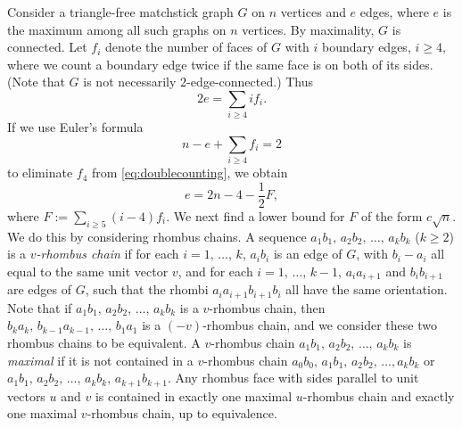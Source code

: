 \documentclass[12pt]{article}
\theoremstyle{plain}
\theoremstyle{definition}
\theoremstyle{remark}
\begin{document}
Consider a triangle-free matchstick graph $G$ on $n$ vertices and $e$ edges, where $e$ is the maximum among all such graphs on $n$ vertices.
By maximality, $G$ is connected.
Let $f_i$ denote the number of faces of $G$ with $i$ boundary edges, $i\geq 4$, where we count a boundary edge twice if the same face is on both of its sides.
(Note that $G$ is not necessarily $2$-edge-connected.)
Thus
\begin{equation}\label{eq:doublecounting}
2e=\sum_{i\geq 4} if_i.
\end{equation}
If we use Euler's formula
\begin{equation}\label{eq:Euler}
n-e+\sum_{i\geq 4}f_i = 2
\end{equation}
to eliminate $f_4$ from \eqref{eq:doublecounting}, we obtain
\begin{equation}\label{eq:consequence}
e = 2n-4-\frac12F,
\end{equation}
where $F:=\sum\limits_{i\geq 5}(i-4)f_i$.
We next find a lower bound for $F$ of the form $c\sqrt{n}$.
We do this by considering rhombus chains.
A sequence $a_1b_1, \, a_2b_2, \, \dots, \, a_kb_k$ ($k\geq 2$) is a \emph{$v$-rhombus chain} if for each $i=1, \, \dots, \, k$, $a_ib_i$ is an edge of $G$, with $b_i-a_i$ all equal to the same unit vector $v$, and for each $i=1, \, \dots, \, k-1$, $a_ia_{i+1}$ and $b_ib_{i+1}$ are edges of $G$, such that the rhombi $a_ia_{i+1}b_{i+1}b_i$ all have the same orientation.
Note that if $a_1b_1, \, a_2b_2, \, \dots, \, a_kb_k$ is a $v$-rhombus chain, then $b_ka_k, \, b_{k-1}a_{k-1}, \, \dots, \, b_1a_1$ is a $(-v)$-rhombus chain, and we consider these two rhombus chains to be equivalent.
A $v$-rhombus chain $a_1b_1, \, a_2b_2, \, \dots, \, a_kb_k$ is \emph{maximal} if it is not contained in a $v$-rhombus chain $a_0b_0, \, a_1b_1, \, a_2b_2, \, \dots,a_kb_k$ or $a_1b_1, \, a_2b_2, \, \dots, \, a_kb_k, \, a_{k+1}b_{k+1}$.
Any rhombus face with sides parallel to unit vectors $u$ and $v$ is contained in exactly one maximal $u$-rhombus chain and exactly one maximal $v$-rhombus chain, up to equivalence.
\end{document}
